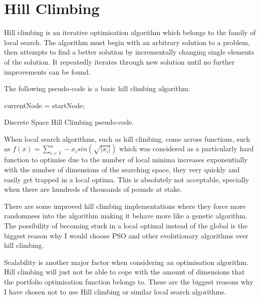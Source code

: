 \documentclass{pdfmx4020}
\begin{document}
  \section{Hill Climbing} %
  \label{sec:hill_climbing}
  Hill climbing \cite{hill,hill2} is an iterative optimisation algorithm which belongs to the family of local search. The algorithm must begin with an arbitrary solution to a problem, then attempts to find a better solution by incrementally changing single elements of the solution. It repeatedly iterates through new solution until no further improvements can be found. 

  The following pseudo-code is a basic hill climbing algorithm:

    \begin{algorithm}[H] \label{eq:hill}
      currentNode = startNode; \\
      \caption{Discrete Space Hill Climbing pseudo-code.}
    \end{algorithm}
  When local search algorithms, such as hill climbing, come across functions, such as $f(x)=\sum\limits_{i=1}^n -x_i sin(\sqrt{|x_i|})$ which was considered \cite{localmin} as a particularly hard function to optimise due to the number of local minima increases exponentially with the number of dimensions of the searching space, they very quickly and easily get trapped in a local optima. This is absolutely not acceptable, specially when there are hundreds of thousands of pounds at stake. 

  There are some improved hill climbing implementations \cite{hill3} where they force more randomness into the algorithm making it behave more like a genetic algorithm. The possibility of becoming stuck in a local optimal instead of the global is the biggest reason why I would choose PSO and other evolutionary algorithms over hill climbing. 

  Scalability is another major factor when considering an optimisation algorithm. Hill climbing will just not be able to cope with the amount of dimensions that the portfolio optimisation function belongs to. These are the biggest reasons why I have chosen not to use Hill climbing or similar local search algorithms. 
\end{document}
